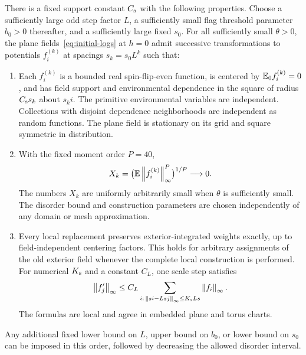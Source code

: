 \begin{proposition}
\label{prop:bulk-input}
There is a fixed support constant $C_{\rm s}$ with the following
properties.  Choose a sufficiently large odd step factor $L$, a
sufficiently small flag threshold parameter $b_0>0$ thereafter, and a
sufficiently large fixed $s_0$.  For all sufficiently small $\theta>0$,
the plane fields~\eqref{eq:initial-logs} at $h=0$ admit successive
transformations to potentials $f_i^{(k)}$ at spacings $s_k=s_0L^k$ such
that:
\begin{enumerate}
\item Each $f_i^{(k)}$ is a bounded real spin-flip-even function, is
centered by $\mathbb E_0 f_i^{(k)}=0$, and has field support and environmental
dependence in the square of radius $C_{\rm s}s_k$ about $s_ki$.
The primitive environmental variables are independent.  Collections
with disjoint dependence neighborhoods are independent as random
functions.  The plane field is stationary on its grid and square
symmetric in distribution.
\item With the fixed moment order $P=40$,
\begin{equation}
 X_k=\bigl(\mathbb E\left\lVert f_i^{(k)}\right\rVert_\infty^P\bigr)^{1/P}
 \longrightarrow0.
 \label{eq:bulk-decay}
\end{equation}
The numbers $X_k$ are uniformly arbitrarily small when $\theta$ is
sufficiently small.  The disorder bound and construction parameters
are chosen independently of any domain or mesh approximation.
\item Every local replacement preserves exterior-integrated weights
exactly, up to field-independent centering factors.  This holds for
arbitrary assignments of the old exterior field whenever the complete
local construction is performed.  For numerical $K_{\rm s}$ and a
constant $C_L$, one scale step satisfies
\begin{equation}
 \left\lVert f'_j\right\rVert_\infty\le
 C_L\sum_{i:\,\left\lVert si-Lsj\right\rVert_\infty\le K_{\rm s}Ls}
          \left\lVert f_i\right\rVert_\infty.
 \label{eq:map-raw-input}
\end{equation}
The formulas are local and agree in embedded plane and torus charts.
\end{enumerate}
Any additional fixed lower bound on $L$, upper bound on $b_0$, or lower
bound on $s_0$ can be imposed in this order, followed by decreasing the
allowed disorder interval.
\end{proposition}

